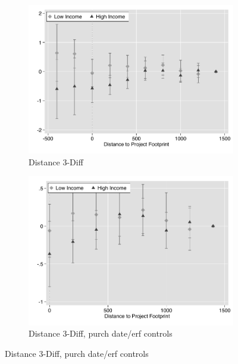 \documentclass[12pt]{article}
\begin{document}
\begin{figure}
        \centering
        \begin{subfigure}[b]{0.48\textwidth}
                    \caption[Network2]%
            {{\footnotesize Distance 3-Diff}}    
            \label{fig:prefor}
            \centering
            \includegraphics[width=\textwidth,trim={0.3cm .3cm 0.1cm 0cm}, clip=true]{figures/price_dist_3d_no_ctrl}
        \end{subfigure}
        \hfill
        \begin{subfigure}[b]{0.48\textwidth}
                    \caption[Network2]%
            {{\footnotesize Distance 3-Diff, purch date/erf controls}}    
            \label{fig:prefor}
            \centering
            \includegraphics[width=\textwidth,trim={0.3cm .3cm 0.1cm 0cm}, clip=true]{figures/price_dist_3d_ctrl}

\end{subfigure}
\end{figure}
\end{document}
